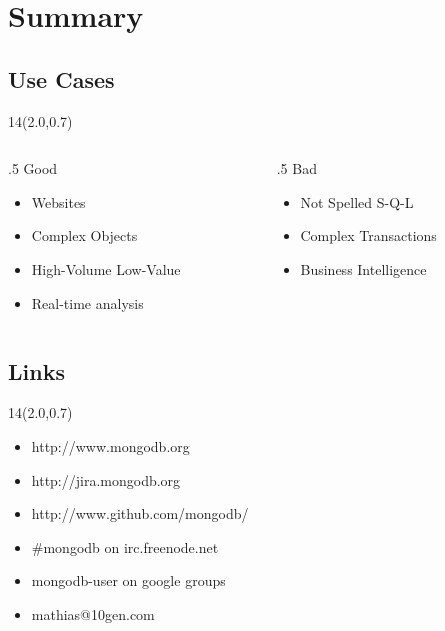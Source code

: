 \documentclass{beamer}
\newcommand{\MongoLogo}{%
\begin{textblock}{14}(2.0,0.7)
  \pgfuseimage{logo}
\end{textblock}
}
\begin{document}
\section{Summary}
\subsection{Use Cases}
\begin{frame}
  \MongoLogo
  \begin{columns}
    \begin{column}{.5\linewidth}
      Good
      \begin{itemize}
        \item Websites
        \item Complex Objects
        \item High-Volume Low-Value
        \item Real-time analysis
      \end{itemize}
    \end{column}

    \begin{column}{.5\linewidth}
      Bad
      \begin{itemize}
        \item Not Spelled S-Q-L
        \item Complex Transactions
        \item Business Intelligence
      \end{itemize}
    \end{column}
  \end{columns}
\end{frame}

\subsection{Links}
\begin{frame}
  \MongoLogo
  \begin{itemize}
    \item http://www.mongodb.org
    \item http://jira.mongodb.org
    \item http://www.github.com/mongodb/
  \end{itemize}
  \begin{itemize}
    \item \#mongodb on irc.freenode.net
    \item mongodb-user on google groups
    \item mathias@10gen.com
  \end{itemize}
\end{frame}
\end{document}
